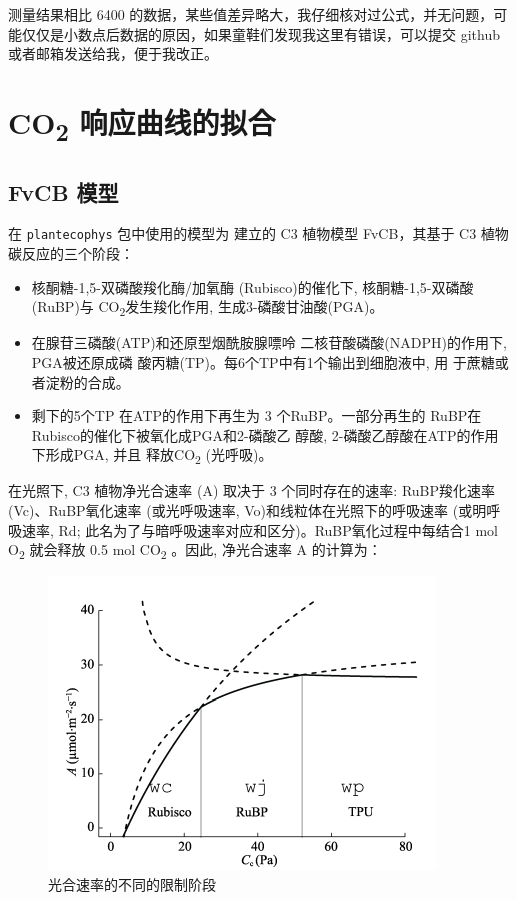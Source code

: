 \documentclass[
]{krantz}
\begin{document}
测量结果相比 6400 的数据，某些值差异略大，我仔细核对过公式，并无问题，可能仅仅是小数点后数据的原因，如果童鞋们发现我这里有错误，可以提交 github 或者邮箱发送给我，便于我改正。

\cleardoublepage

\hypertarget{response_fit}{%
\chapter{\texorpdfstring{CO\textsubscript{2} 响应曲线的拟合}{CO2 响应曲线的拟合}}\label{response_fit}}

\hypertarget{fvcb_mod}{%
\section{FvCB 模型}\label{fvcb_mod}}

在 \texttt{plantecophys} 包中使用的模型为 \citet{Farquhar1980A} 建立的 C3 植物模型 FvCB，其基于 C3 植物碳反应的三个阶段：

\begin{itemize}
\item
  核酮糖-1,5-双磷酸羧化酶/加氧酶 (Rubisco)的催化下, 核酮糖-1,5-双磷酸(RuBP)与 CO\textsubscript{2}发生羧化作用, 生成3-磷酸甘油酸(PGA)。
\item
  在腺苷三磷酸(ATP)和还原型烟酰胺腺嘌呤 二核苷酸磷酸(NADPH)的作用下, PGA被还原成磷 酸丙糖(TP)。每6个TP中有1个输出到细胞液中,
  用 于蔗糖或者淀粉的合成。
\item
  剩下的5个TP 在ATP的作用下再生为 3 个RuBP。一部分再生的 RuBP在Rubisco的催化下被氧化成PGA和2-磷酸乙 醇酸,
  2-磷酸乙醇酸在ATP的作用下形成PGA, 并且 释放CO\textsubscript{2} (光呼吸)。
\end{itemize}

在光照下, C3 植物净光合速率 (A) 取决于 3 个同时存在的速率: RuBP羧化速率(Vc)、RuBP氧化速率 (或光呼吸速率,
Vo)和线粒体在光照下的呼吸速率 (或明呼吸速率, Rd; 此名为了与暗呼吸速率对应和区分)。RuBP氧化过程中每结合1 mol
O\textsubscript{2} 就会释放 0.5 mol CO\textsubscript{2} 。因此, 净光合速率 A 的计算为：

\begin{figure}
\includegraphics[width=1\linewidth]{images/fvcb} \caption{光合速率的不同的限制阶段}\label{fig:fvcb}
\end{figure}
\end{document}
